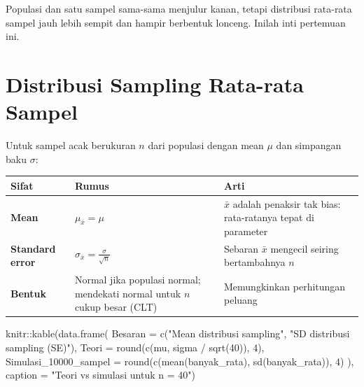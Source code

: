 \documentclass[
  indonesian,
  letterpaper,
]{book}
\newenvironment{Shaded}{\begin{snugshade}}{\end{snugshade}}
\newcommand{\AttributeTok}[1]{\textcolor[rgb]{0.40,0.45,0.13}{#1}}
\newcommand{\DecValTok}[1]{\textcolor[rgb]{0.68,0.00,0.00}{#1}}
\newcommand{\FunctionTok}[1]{\textcolor[rgb]{0.28,0.35,0.67}{#1}}
\newcommand{\NormalTok}[1]{\textcolor[rgb]{0.00,0.23,0.31}{#1}}
\newcommand{\SpecialCharTok}[1]{\textcolor[rgb]{0.37,0.37,0.37}{#1}}
\newcommand{\StringTok}[1]{\textcolor[rgb]{0.13,0.47,0.30}{#1}}
\newcounter{none} %
\begin{document}
Populasi dan satu sampel sama-sama menjulur kanan, tetapi distribusi
rata-rata sampel jauh lebih sempit dan hampir berbentuk lonceng. Inilah
inti pertemuan ini.

\section{Distribusi Sampling Rata-rata
Sampel}\label{distribusi-sampling-rata-rata-sampel}

Untuk sampel acak berukuran \(n\) dari populasi dengan mean \(\mu\) dan
simpangan baku \(\sigma\):

{\def\LTcaptype{none} %
\begin{longtable}[]{@{}
  >{\raggedright\arraybackslash}p{}
  >{\raggedright\arraybackslash}p{}
  >{\raggedright\arraybackslash}p{}@{}}
\toprule\noalign{}
\begin{minipage}[b]{\linewidth}\raggedright
Sifat
\end{minipage} & \begin{minipage}[b]{\linewidth}\raggedright
Rumus
\end{minipage} & \begin{minipage}[b]{\linewidth}\raggedright
Arti
\end{minipage} \\
\midrule\noalign{}
\endhead
\bottomrule\noalign{}
\endlastfoot
\textbf{Mean} & \(\mu_{\bar{x}} = \mu\) & \(\bar{x}\) adalah penaksir
tak bias: rata-ratanya tepat di parameter \\
\textbf{Standard error} & \(\sigma_{\bar{x}} = \frac{\sigma}{\sqrt{n}}\)
& Sebaran \(\bar{x}\) mengecil seiring bertambahnya \(n\) \\
\textbf{Bentuk} & Normal jika populasi normal; mendekati normal untuk
\(n\) cukup besar (CLT) & Memungkinkan perhitungan peluang \\
\end{longtable}
}

\begin{Shaded}
\begin{Highlighting}[]
\NormalTok{knitr}\SpecialCharTok{::}\FunctionTok{kable}\NormalTok{(}\FunctionTok{data.frame}\NormalTok{(}
  \AttributeTok{Besaran =} \FunctionTok{c}\NormalTok{(}\StringTok{"Mean distribusi sampling"}\NormalTok{, }\StringTok{"SD distribusi sampling (SE)"}\NormalTok{),}
  \AttributeTok{Teori =} \FunctionTok{round}\NormalTok{(}\FunctionTok{c}\NormalTok{(mu, sigma }\SpecialCharTok{/} \FunctionTok{sqrt}\NormalTok{(}\DecValTok{40}\NormalTok{)), }\DecValTok{4}\NormalTok{),}
  \AttributeTok{Simulasi\_10000\_sampel =} \FunctionTok{round}\NormalTok{(}\FunctionTok{c}\NormalTok{(}\FunctionTok{mean}\NormalTok{(banyak\_rata), }\FunctionTok{sd}\NormalTok{(banyak\_rata)), }\DecValTok{4}\NormalTok{)}
\NormalTok{), }\AttributeTok{caption =} \StringTok{"Teori vs simulasi untuk n = 40"}\NormalTok{)}
\end{Highlighting}
\end{Shaded}
\end{document}

